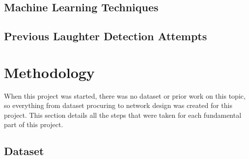 \documentclass[a4paper,11pt,notitlepage]{article}
\begin{document}

\subsection{Machine Learning Techniques}

\subsection{Previous Laughter Detection Attempts}

\section{Methodology}


When this project was started, there was no dataset or prior work on this topic, so everything from dataset procuring to network design was created for this project. This section details all the steps that were taken for each fundamental part of this project.

\subsection{Dataset}

\end{document}
